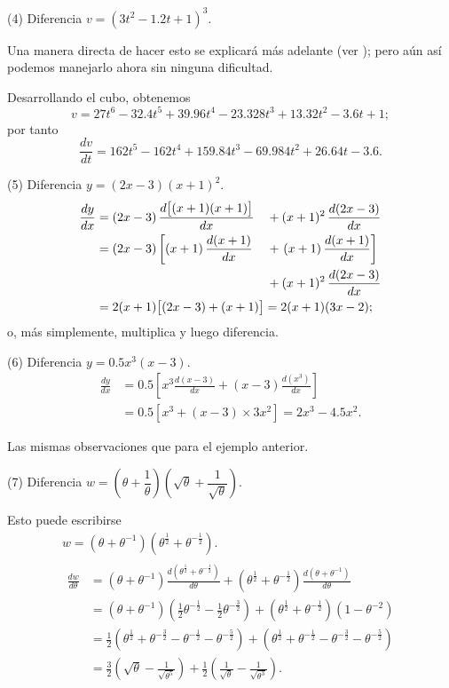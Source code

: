 \documentclass[12pt]{book}[2005/09/16]
\newcommand{\DPPageSep}[2]{\Pagelabel{#2}}
\newcommand{\Pagelabel}[1]
  {\phantomsection\label{#1}}
\newcommand{\Pageref}[2][p.]{%
  \ifthenelse{\not\equal{#1}{}}{%
    \hyperref[#2]{#1~\pageref{#2}}%
  }{%
    \hyperref[#2]{\pageref{#2}}%
  }%
}
\newcommand{\efrac}[2]{\frac{#1}{#2}}
\begin{document}
(4) Diferencia $v = (3t^2 - 1.2 t + 1)^3$.

Una manera directa de hacer esto se explicará más adelante
(ver \Pageref{dodge}); pero aún así podemos manejarlo ahora
sin ninguna dificultad.

Desarrollando el cubo, obtenemos
\[
v = 27t^6 - 32.4t^5 + 39.96t^4 - 23.328t^3 + 13.32t^2 - 3.6t + 1; %
\]
por tanto
\[
\frac{dv}{dt} = 162t^5 - 162t^4 + 159.84t^3 - 69.984t^2 + 26.64t - 3.6.
\]

(5) Diferencia $y = (2x - 3)(x + 1)^2$.
\begin{alignat*}{2}
\frac{dy}{dx}
  &= (2x - 3)\, \frac{d\bigl[(x + 1)(x + 1)\bigr]}{dx}
     &&+ (x + 1)^2\, \frac{d(2x - 3)}{dx} \\
  &= (2x - 3) \left[(x + 1)\, \frac{d(x + 1)}{dx}\right.
     &&+ \left.(x + 1)\, \frac{d(x + 1)}{dx}\right] \\
  &  &&+ (x + 1)^2\, \frac{d(2x - 3)}{dx} \\
  &= \rlap{$2(x + 1)\bigl[(2x - 3) + (x + 1)\bigr] = 2(x + 1)(3x - 2)$;}&&
\end{alignat*}
o, más simplemente, multiplica y luego diferencia.
\DPPageSep{055.png}{43}%

(6) Diferencia $y = 0.5 x^3(x-3)$.
\begin{align*}
\frac{dy}{dx}
  &= 0.5\left[x^3 \frac{d(x-3)}{dx} + (x-3) \frac{d(x^3)}{dx}\right] \\
  &= 0.5\left[x^3 + (x-3) × 3x^2\right] = 2x^3 - 4.5x^2.
\end{align*}

Las mismas observaciones que para el ejemplo anterior.

(7) Diferencia $w = \left(\theta + \dfrac{1}{\theta}\right)
   \left(\sqrt{\theta} + \dfrac{1}{\sqrt{\theta}}\right)$.

Esto puede escribirse
\begin{gather*}
w = (\theta + \theta^{-1})(\theta^{\efrac{1}{2}} + \theta^{-\efrac{1}{2}}). \\
\begin{aligned}
\frac{dw}{d\theta}
  &= (\theta + \theta^{-1})
     \frac{d(\theta^{\efrac{1}{2}} + \theta^{-\efrac{1}{2}})}{d\theta}
   + (\theta^{\efrac{1}{2}} + \theta^{-\efrac{1}{2}})
     \frac{d(\theta+\theta^{-1})}{d\theta} \\
%
  &= (\theta + \theta^{-1})(\tfrac{1}{2}\theta^{-\efrac{1}{2}}
                          - \tfrac{1}{2}\theta^{-\efrac{3}{2}})
   + (\theta^{\efrac{1}{2}} + \theta^{-\efrac{1}{2}})(1 - \theta^{-2}) \\
%
  &= \tfrac{1}{2}(\theta^{ \efrac{1}{2}} + \theta^{-\efrac{3}{2}}
                - \theta^{-\efrac{1}{2}} - \theta^{-\efrac{5}{2}})
   + (\theta^{ \efrac{1}{2}} + \theta^{-\efrac{1}{2}}
    - \theta^{-\efrac{3}{2}} - \theta^{-\efrac{5}{2}}) \\%
%
  &= \tfrac{3}{2} \left(\sqrt{\theta} - \frac{1}{\sqrt{\theta^5}}\right)
   + \tfrac{1}{2} \left(\frac{1}{\sqrt{\theta}} - \frac{1}{\sqrt{\theta^3}}\right).
\end{aligned}
\end{gather*}
\end{document}
